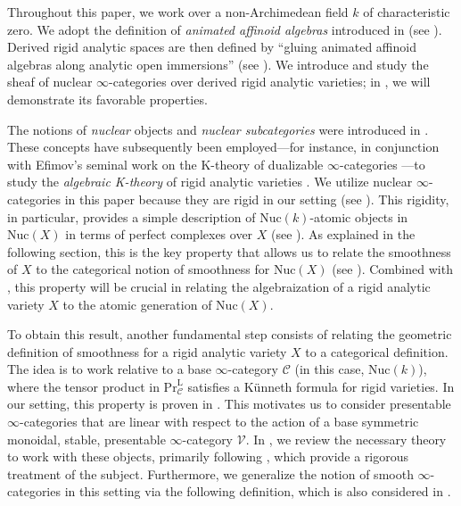 \documentclass[oneside, hidelinks, 12pt, a4paper,reqno]{amsart}
\theoremstyle{plain}
\theoremstyle{definition}
\theoremstyle{plain}
\newcommand{\rL}{\mathrm L}
\newcommand{\cat}{$\infty$-category }
\newcommand{\cates}{$\infty$-categories }
\newcommand{\LPr}{\mathrm{Pr}^\rL}
\newcommand{\Nuc}{\mathrm{Nuc}}
\begin{document}
Throughout this paper, we work over a non-Archimedean field $k$ of characteristic zero. We adopt the definition of \emph{animated affinoid algebras} introduced in \cite[Definition 2.11]{mikami2023fppfdescentcondensedanimatedrings} (see ). Derived rigid analytic spaces are then defined by ``gluing animated affinoid algebras along analytic open immersions'' (see ). We introduce and study the sheaf of nuclear \cates over derived rigid analytic varieties; in , we will demonstrate its favorable properties.

The notions of \emph{nuclear} objects and \emph{nuclear subcategories} were introduced in \cite{complex}. These concepts have subsequently been employed---for instance, in conjunction with Efimov's seminal work on the K-theory of dualizable \cates \cite{efimov2024k}---to study the \emph{algebraic K-theory} of rigid analytic varieties \cite{andreychev2023ktheorieadischerraume}. We utilize nuclear \cates in this paper because they are rigid in our setting (see ). This rigidity, in particular, provides a simple description of $\Nuc(k)$-atomic objects in $\Nuc(X)$ in terms of perfect complexes over $X$ (see ). As explained in the following section, this is the key property that allows us to relate the smoothness of $X$ to the categorical notion of smoothness for $\Nuc(X)$ (see ). Combined with , this property will be crucial in relating the algebraization of a rigid analytic variety $X$ to the atomic generation of $\Nuc(X)$.

To obtain this result, another fundamental step consists of relating the geometric definition of smoothness for a rigid analytic variety $X$ to a categorical definition. The idea is to work relative to a base $\infty$-category $\mathscr{C}$ (in this case, $\Nuc(k)$), where the tensor product in $\LPr_{\mathscr{C}}$ satisfies a K\"unneth formula for rigid varieties. In our setting, this property is proven in . This motivates us to consider presentable \cates that are linear with respect to the action of a base symmetric monoidal, stable, presentable \cat $\mathscr{V}$. In , we review the necessary theory to work with these objects, primarily following \cite{BenMoshe2024, ramzi2024dualizablepresentableinftycategories,hinich2021yonedalemmaenrichedinfinity, heine2023, Gepner2015}, which provide a rigorous treatment of the subject. Furthermore, we generalize the notion of smooth \cates in this setting via the following definition, which is also considered in \cite{ramzi2024dualizablepresentableinftycategories}.
\end{document}
